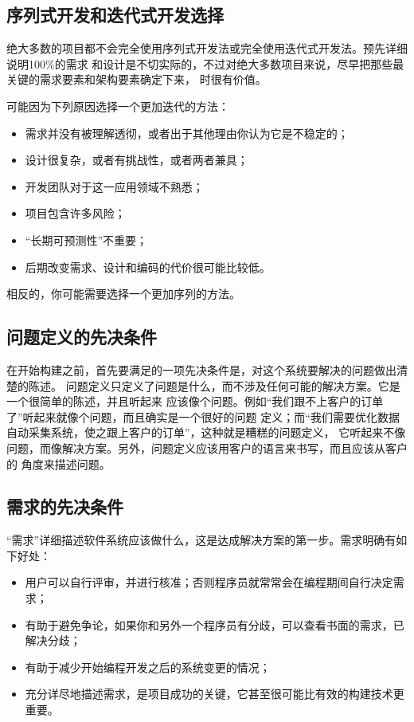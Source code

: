 \documentclass{article}
\begin{document}
\subsection{序列式开发和迭代式开发选择}
绝大多数的项目都不会完全使用序列式开发法或完全使用迭代式开发法。预先详细说明100\%的需求
和设计是不切实际的，不过对绝大多数项目来说，尽早把那些最关键的需求要素和架构要素确定下来，
时很有价值。
\par
可能因为下列原因选择一个更加迭代的方法：
\begin{itemize}
    \item 需求并没有被理解透彻，或者出于其他理由你认为它是不稳定的；
    \item 设计很复杂，或者有挑战性，或者两者兼具；
    \item 开发团队对于这一应用领域不熟悉；
    \item 项目包含许多风险；
    \item “长期可预测性”不重要；
    \item 后期改变需求、设计和编码的代价很可能比较低。
\end{itemize}
相反的，你可能需要选择一个更加序列的方法。

\subsection{问题定义的先决条件}
在开始构建之前，首先要满足的一项先决条件是，对这个系统要解决的问题做出清楚的陈述。
问题定义只定义了问题是什么，而不涉及任何可能的解决方案。它是一个很简单的陈述，并且听起来
应该像个问题。例如“我们跟不上客户的订单了”听起来就像个问题，而且确实是一个很好的问题
定义；而“我们需要优化数据自动采集系统，使之跟上客户的订单”，这种就是糟糕的问题定义，
它听起来不像问题，而像解决方案。另外，问题定义应该用客户的语言来书写，而且应该从客户的
角度来描述问题。

\subsection{需求的先决条件}
“需求”详细描述软件系统应该做什么，这是达成解决方案的第一步。需求明确有如下好处：
\begin{itemize}
    \item 用户可以自行评审，并进行核准；否则程序员就常常会在编程期间自行决定需求；
    \item 有助于避免争论，如果你和另外一个程序员有分歧，可以查看书面的需求，已解决分歧；
    \item 有助于减少开始编程开发之后的系统变更的情况；
    \item 充分详尽地描述需求，是项目成功的关键，它甚至很可能比有效的构建技术更重要。
\end{itemize}
\end{document}
